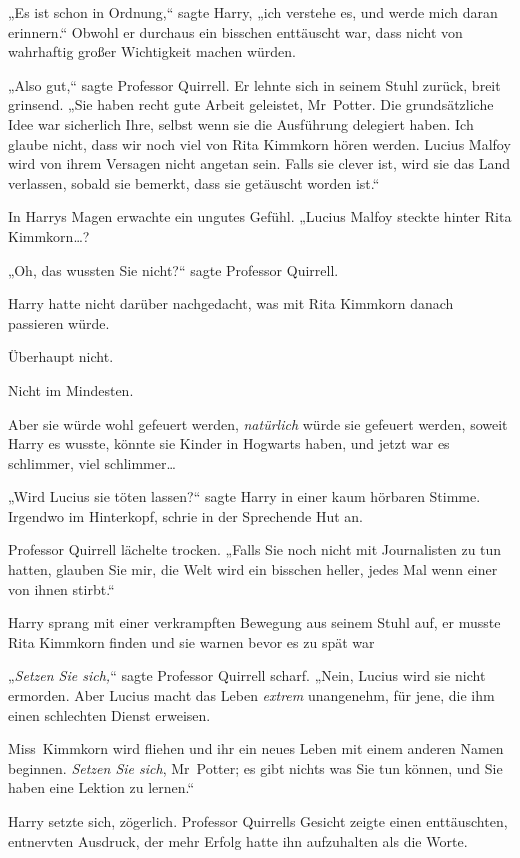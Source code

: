 {„Es ist schon in Ordnung,“ sagte Harry, „ich verstehe es, und werde mich daran erinnern.“ Obwohl er durchaus ein bisschen enttäuscht war, dass nicht von wahrhaftig großer Wichtigkeit machen würden.

„Also gut,“ sagte Professor Quirrell. Er lehnte sich in seinem Stuhl zurück, breit grinsend. „Sie haben recht gute Arbeit geleistet, Mr~Potter. Die grundsätzliche Idee war sicherlich Ihre, selbst wenn sie die Ausführung delegiert haben. Ich glaube nicht, dass wir noch viel von Rita Kimmkorn hören werden. Lucius Malfoy wird von ihrem Versagen nicht angetan sein. Falls sie clever ist, wird sie das Land verlassen, sobald sie bemerkt, dass sie getäuscht worden ist.“

In Harrys Magen erwachte ein ungutes Gefühl. „Lucius Malfoy steckte hinter Rita Kimmkorn…?

„Oh, das wussten Sie nicht?“ sagte Professor Quirrell.

Harry hatte nicht darüber nachgedacht, was mit Rita Kimmkorn danach passieren würde.

Überhaupt nicht.

Nicht im Mindesten.

Aber sie würde wohl gefeuert werden, \emph{natürlich} würde sie gefeuert werden, soweit Harry es wusste, könnte sie Kinder in Hogwarts haben, und jetzt war es schlimmer, viel schlimmer…

„Wird Lucius sie töten lassen?“ sagte Harry in einer kaum hörbaren Stimme. Irgendwo im Hinterkopf, schrie in der Sprechende Hut an.

Professor Quirrell lächelte trocken. „Falls Sie noch nicht mit Journalisten zu tun hatten, glauben Sie mir, die Welt wird ein bisschen heller, jedes Mal wenn einer von ihnen stirbt.“

Harry sprang mit einer verkrampften Bewegung aus seinem Stuhl auf, er musste Rita Kimmkorn finden und sie warnen bevor es zu spät war \later

„\emph{Setzen Sie sich,}“ sagte Professor Quirrell scharf. „Nein, Lucius wird sie nicht ermorden. Aber Lucius macht das Leben \emph{extrem} unangenehm, für jene, die ihm einen schlechten Dienst erweisen.

Miss~Kimmkorn wird fliehen und ihr ein neues Leben mit einem anderen Namen beginnen. \emph{Setzen Sie sich}, Mr~Potter; es gibt nichts was Sie tun können, und Sie haben eine Lektion zu lernen.“

Harry setzte sich, zögerlich. Professor Quirrells Gesicht zeigte einen enttäuschten, entnervten Ausdruck, der mehr Erfolg hatte ihn aufzuhalten als die Worte.

}
